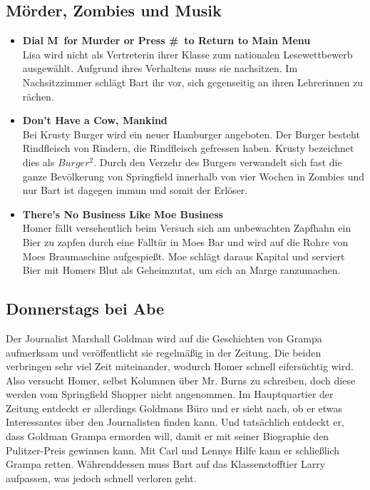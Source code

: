 \subsection{Mörder, Zombies und Musik}
\begin{itemize}
	\item \textbf{Dial \grqq M\grqq\ for Murder or Press \grqq \#\grqq\ to Return to Main Menu}\\ Lisa wird nicht als Vertreterin ihrer Klasse zum nationalen Lesewettbewerb ausgewählt. Aufgrund ihres Verhaltens muss sie nachsitzen. Im Nachsitzzimmer schlägt Bart ihr vor, sich gegenseitig an ihren Lehrerinnen zu rächen.
	\item \textbf{Don't Have a Cow, Mankind}\\  Bei Krusty Burger wird ein neuer Hamburger angeboten. Der Burger besteht Rindfleisch von Rindern, die Rindfleisch gefressen haben. Krusty bezeichnet dies als $Burger^2$. Durch den Verzehr des Burgers verwandelt sich fast die ganze Bevölkerung von Springfield innerhalb von vier Wochen in Zombies und nur Bart ist dagegen immun und somit der Erlöser.
	\item \textbf{There's No Business Like Moe Business}\\ Homer fällt versehentlich beim Versuch sich am unbewachten Zapfhahn ein Bier zu zapfen durch eine Falltür in Moes Bar und wird auf die Rohre von Moes Braumaschine aufgespießt. Moe schlägt daraus Kapital und serviert Bier mit Homers Blut als Geheimzutat, um sich an Marge ranzumachen. 
\end{itemize}


\subsection{Donnerstags bei Abe}
Der Journalist Marshall Goldman wird auf die Geschichten von Grampa aufmerksam und veröffentlicht sie regelmäßig in der Zeitung. Die beiden verbringen sehr viel Zeit miteinander, wodurch Homer schnell eifersüchtig wird. Also versucht Homer, selbst Kolumnen über Mr. Burns zu schreiben, doch diese werden vom Springfield Shopper nicht angenommen. Im Hauptquartier der Zeitung entdeckt er allerdings Goldmans Büro und er sieht nach, ob er etwas Interessantes über den Journalisten finden kann. Und tatsächlich entdeckt er, dass Goldman Grampa ermorden will, damit er mit seiner Biographie den Pulitzer-Preis gewinnen kann. Mit Carl und Lennys Hilfe kann er schließlich Grampa retten. Währenddessen muss Bart auf das Klassenstofftier Larry aufpassen, was jedoch schnell verloren geht.

